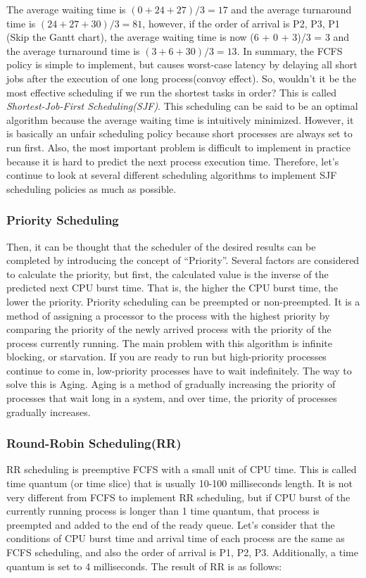 \documentclass{homework}
\begin{document}
The average waiting time is $(0 + 24 + 27)/3 = 17$ and the average turnaround time is $(24 + 27 + 30)/3 = 81$, however, if the order of arrival is P2, P3, P1 (Skip the Gantt chart), the average waiting time is now (6 + 0 + 3)/3 = 3 and the average turnaround time is $(3 + 6 + 30)/3 = 13$. In summary, the FCFS policy is simple to implement, but causes worst-case latency by delaying all short jobs after the execution of one long process(convoy effect). So, wouldn't it be the most effective scheduling if we run the shortest tasks in order? This is called \textit{Shortest-Job-First Scheduling(SJF)}. This scheduling can be said to be an optimal algorithm because the average waiting time is intuitively minimized. However, it is basically an unfair scheduling policy because short processes are always set to run first. Also, the most important problem is difficult to implement in practice because it is hard to predict the next process execution time. Therefore, let's continue to look at several different scheduling algorithms to implement SJF scheduling policies as much as possible.

\subsubsection{Priority Scheduling}
Then, it can be thought that the scheduler of the desired results can be completed by introducing the concept of “Priority”. Several factors are considered to calculate the priority, but first, the calculated value is the inverse of the predicted next CPU burst time. That is, the higher the CPU burst time, the lower the priority. Priority scheduling can be preempted or non-preempted. It is a method of assigning a processor to the process with the highest priority by comparing the priority of the newly arrived process with the priority of the process currently running. The main problem with this algorithm is infinite blocking, or starvation. If you are ready to run but high-priority processes continue to come in, low-priority processes have to wait indefinitely. The way to solve this is Aging. Aging is a method of gradually increasing the priority of processes that wait long in a system, and over time, the priority of processes gradually increases.

\subsubsection{Round-Robin Scheduling(RR)}
RR scheduling is preemptive FCFS with a small unit of CPU time. This is called time quantum (or time slice) that is usually 10-100 milliseconds length. It is not very different from FCFS to implement RR scheduling, but if CPU burst of the currently running process is longer than 1 time quantum, that process is preempted and added to the end of the ready queue. Let’s consider that the conditions of CPU burst time and arrival time of each process are the same as FCFS scheduling, and also the order of arrival is P1, P2, P3. Additionally, a time quantum is set to 4 milliseconds. The result of RR is as follows:
\end{document}
